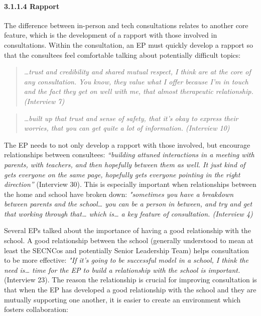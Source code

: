 \documentclass[
  english,
  man]{apa7}
\let\oldparagraph\paragraph
\renewcommand{\paragraph}[1]{\oldparagraph{#1}\mbox{}}
\begin{document}
\hypertarget{rapport}{%
\paragraph{3.1.1.4 Rapport}\label{rapport}}

The difference between in-person and tech consultations relates to another core feature, which is the development of a rapport with those involved in consultations. Within the consultation, an EP must quickly develop a rapport so that the consultees feel comfortable talking about potentially difficult topics:

\begin{quote}
\emph{\ldots trust and credibility and shared mutual respect, I think are at the
core of any consultation. You know, they value what I offer because
I'm in touch and the fact they get on well with me, that almost
therapeutic relationship. (Interview 7)}
\end{quote}

\begin{quote}
\emph{\ldots built up that trust and sense of safety, that it's okay to express
their worries, that you can get quite a lot of information. (Interview
10)}
\end{quote}

The EP needs to not only develop a rapport with those involved, but encourage relationships between consultees: \emph{``building attuned interactions in a meeting with parents, with teachers, and then hopefully between them as well. It just kind of gets everyone on the same page, hopefully gets everyone pointing in the right direction''} (Interview 30). This is especially important when relationships between the home and school have broken down: \emph{"sometimes you have a breakdown between parents and the school\ldots{} you can be a person in between, and try and get that working through that\ldots{} which is\ldots{} a key feature of consultation. (Interview 4)}

Several EPs talked about the importance of having a good relationship with the school. A good relationship between the school (generally understood to mean at least the SECNCos and potentially Senior Leadership Team) helps consultation to be more effective: \emph{"If it's going to be successful model in a school, I think the need is\ldots{} time for the EP to build a relationship with the school is important.} (Interview 23). The reason the relationship is crucial for improving consultation is that when the EP has developed a good relationship with the school and they are mutually supporting one another, it is easier to create an environment which fosters collaboration:
\end{document}
